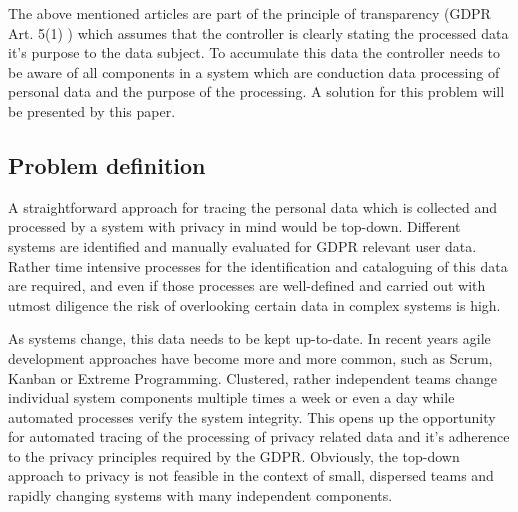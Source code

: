 The above mentioned articles are part of the principle of transparency (GDPR Art. 5(1) \cite{EuropeanParliamentandoftheCouncil3026GeneralRegulation}) which assumes that the controller is clearly stating the processed data it's purpose to the data subject. To accumulate this data the controller needs to be aware of all components in a system which are conduction data processing of personal data and the purpose of the processing. A solution for this problem will be presented by this paper.


\subsection{Problem definition}\label{problem}


A straightforward approach for tracing the personal data which is collected and processed by a system with privacy in mind would be top-down. Different systems are identified and manually evaluated for GDPR relevant user data. Rather time intensive processes for the identification and cataloguing of this data are required, and even if those processes are well-defined and carried out with utmost diligence the risk of overlooking certain data in complex systems is high.

As systems change, this data needs to be kept up-to-date. In recent years agile development approaches have become more and more common, such as Scrum, Kanban or Extreme Programming. Clustered, rather independent teams change individual system components multiple times a week or even a day while automated processes verify the system integrity. This opens up the opportunity for automated tracing of the processing of privacy related data and it's adherence to the privacy principles required by the GDPR. Obviously, the top-down approach to privacy is not feasible in the context of small, dispersed teams and rapidly changing systems with many independent components.

